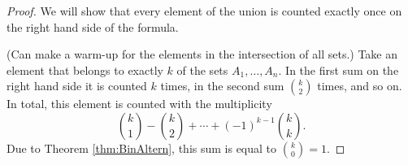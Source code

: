 

\setcounter{section}{5}
\setcounter{subsection}{1}
\setcounter{dfn}{1}

\begin{proof}
We will show that every element of the union is counted exactly once on the right hand side of the formula.

(Can make a warm-up for the elements in the intersection of all sets.)
Take an element that belongs to exactly $k$ of the sets $A_1, \ldots, A_n$.
In the first sum on the right hand side it is counted $k$ times,
in the second sum $\binom{k}{2}$ times, and so on.
In total, this element is counted with the multiplicity
\[
\binom{k}{1} - \binom{k}{2} + \cdots + (-1)^{k-1}\binom{k}{k}.
\]
Due to Theorem \ref{thm:BinAltern}, this sum is equal to $\binom{k}{0} = 1$.
\end{proof}



